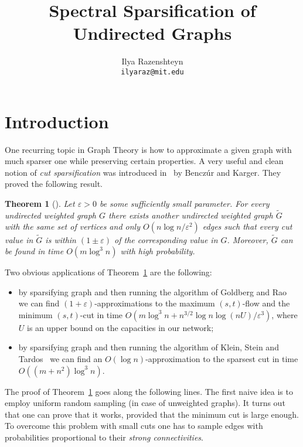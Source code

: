 \documentclass[12pt]{article}
\newcommand{\eps}{\varepsilon}
\newtheorem{theorem}{Theorem}
\begin{document}
    \title{Spectral Sparsification of Undirected Graphs}
    \author{Ilya Razenshteyn\\\texttt{ilyaraz@mit.edu}}
    \maketitle

    \section{Introduction}

    One recurring topic in Graph Theory is how to approximate a given graph with much sparser one while preserving certain
    properties. A very useful and clean
    notion of \emph{cut sparsification} was introduced in~\cite{BK96} by Bencz\'{u}r and Karger.
    They proved the following result.

    \begin{theorem}[\cite{BK96}]
        \label{benczur_karger}
        Let $\eps > 0$ be some sufficiently small parameter.
        For every undirected weighted graph $G$ there exists another undirected weighted graph $\tilde{G}$ with the
        same set of vertices and only $O(n \log n / \eps^2)$ edges such that every cut value in $\tilde{G}$
        is within $(1 \pm \eps)$ of the corresponding value in $G$. Moreover, $\tilde{G}$ can be found in time
        $O(m \log^3 n)$ with high probability.
    \end{theorem}

    Two obvious applications of Theorem~\ref{benczur_karger} are the following:
    \begin{itemize}
        \item by sparsifying graph and then running the algorithm of Goldberg and Rao~\cite{GR98} we can find
        $(1 + \eps)$-approximations to the maximum $(s, t)$-flow and the minimum $(s, t)$-cut in time
        $O(m \log^3 n + n^{3/2} \log n \log(nU) / \eps^3)$, where $U$ is an upper bound on the capacities in our network;
        \item by sparsifying graph and then running the algorithm of Klein, Stein and Tardos~\cite{KST90} we can find
        an $O(\log n)$-approximation to the sparsest cut in time $O((m + n^2) \log^3 n)$.
    \end{itemize}

    The proof of Theorem~\ref{benczur_karger} goes along the following lines. The first naive idea is to employ uniform
    random sampling (in case of unweighted graphs).
    It turns out that one can prove that it works, provided that the minimum cut is large enough.
    To overcome this problem with small cuts one has to sample edges with probabilities proportional to their
    \emph{strong connectivities}.
\end{document}
